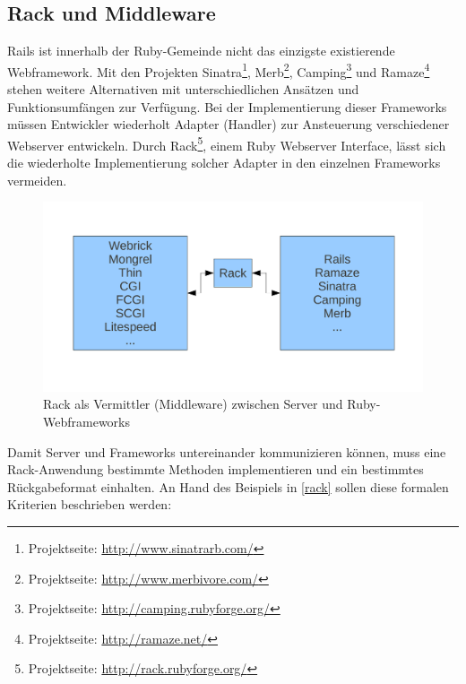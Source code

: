 \subsection{Rack und Middleware}
Rails ist innerhalb der Ruby-Gemeinde nicht das einzigste existierende Webframework. Mit den Projekten Sinatra\footnote{Projektseite: \href{http://www.sinatrarb.com/}{http://www.sinatrarb.com/}}, Merb\footnote{Projektseite: \href{http://www.merbivore.com/}{http://www.merbivore.com/}}, Camping\footnote{Projektseite: \href{http://camping.rubyforge.org/}{http://camping.rubyforge.org/}} und Ramaze\footnote{Projektseite: \href{http://ramaze.net/}{http://ramaze.net/}} stehen weitere Alternativen mit unterschiedlichen Ansätzen und Funktionsumfängen zur Verfügung. 
Bei der Implementierung dieser Frameworks müssen Entwickler wiederholt Adapter (Handler) zur Ansteuerung verschiedener Webserver entwickeln. Durch Rack\footnote{Projektseite: \href{http://rack.rubyforge.org/}{http://rack.rubyforge.org/}}, einem Ruby Webserver Interface, lässt sich die wiederholte Implementierung solcher Adapter in den einzelnen Frameworks vermeiden.
\begin{figure}[!h]
\begin{center}
\includegraphics[scale=0.6]{images/rack/rack.pdf}
\caption{Rack als Vermittler (Middleware) zwischen Server und Ruby-Webframeworks}
\label{rackschema}
\end{center}
\end{figure}


Damit Server und Frameworks untereinander kommunizieren können, muss eine Rack-Anwendung bestimmte Methoden implementieren und ein bestimmtes Rückgabeformat einhalten. An Hand des Beispiels in \ref{rack} sollen diese formalen Kriterien beschrieben werden:



